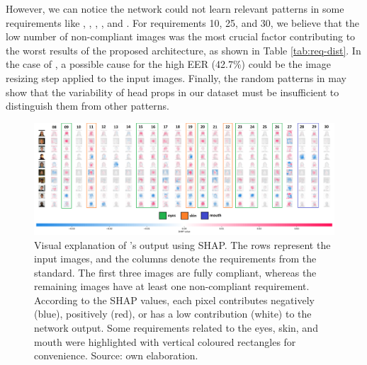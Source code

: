 However, we can notice the network could not learn relevant patterns in some requirements like \inkmarked, \pixelation, \framestooheavy, \hatcap, and \otherfacesortoys. For requirements 10, 25, and 30, we believe that the low number of non-compliant images was the most crucial factor contributing to the worst results of the proposed architecture, as shown in Table \ref{tab:req-dist}. In the case of \pixelation, a possible cause for the high EER (42.7\%) could be the image resizing step applied to the input images. Finally, the random patterns in \hatcap may show that the variability of head props in our dataset must be insufficient to distinguish them from other patterns. 
 
\begin{landscape}
\begin{figure}[tb]
\centering
\includegraphics[width=\linewidth]{images/network_viz/shap.png}
\caption{Visual explanation of \methodname's output using SHAP. The rows represent the input images, and the columns denote the requirements from the \icao standard. The first three images are fully compliant, whereas the remaining images have at least one non-compliant requirement. According to the SHAP values, each pixel contributes negatively (blue), positively (red), or has a low contribution (white) to the network output. Some requirements related to the eyes, skin, and mouth were highlighted with vertical coloured rectangles for convenience. Source: own elaboration.}
\label{fig:shap}
\end{figure}
\end{landscape}
 